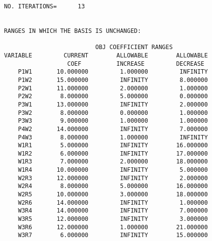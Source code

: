 \begin{verbatim}
 NO. ITERATIONS=      13


 RANGES IN WHICH THE BASIS IS UNCHANGED:

                           OBJ COEFFICIENT RANGES
 VARIABLE         CURRENT        ALLOWABLE        ALLOWABLE
                   COEF          INCREASE         DECREASE
     P1W1       10.000000         1.000000         INFINITY
     P1W2       15.000000         INFINITY         8.000000
     P2W1       11.000000         2.000000         1.000000
     P2W2        8.000000         5.000000         0.000000
     P3W1       13.000000         INFINITY         2.000000
     P3W2        8.000000         0.000000         1.000000
     P3W3        9.000000         1.000000         1.000000
     P4W2       14.000000         INFINITY         7.000000
     P4W3        8.000000         1.000000         INFINITY
     W1R1        5.000000         INFINITY        16.000000
     W1R2        6.000000         INFINITY        17.000000
     W1R3        7.000000         2.000000        18.000000
     W1R4       10.000000         INFINITY         5.000000
     W2R3       12.000000         INFINITY         2.000000
     W2R4        8.000000         5.000000        16.000000
     W2R5       10.000000         3.000000        18.000000
     W2R6       14.000000         INFINITY         1.000000
     W3R4       14.000000         INFINITY         7.000000
     W3R5       12.000000         INFINITY         3.000000
     W3R6       12.000000         1.000000        21.000000
     W3R7        6.000000         INFINITY        15.000000


\end{verbatim}
